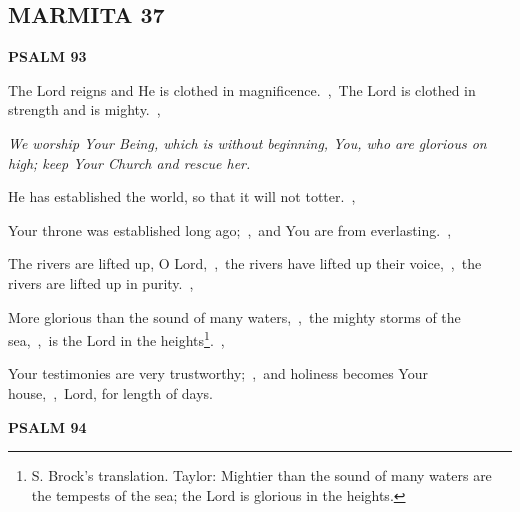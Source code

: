 \documentclass[12pt,twoside,a5paper]{article}
\newcommand{\marmita}[1]{\subsection*{MARMITA {#1}}}
\newcommand{\psalm}[1]{\textbf{PSALM {#1}}\nopagebreak}
\newcommand{\qanona}[1]{{\liturgicalhint{Qanona.} \emph{#1}}}
\begin{document}
\marmita{37}

\psalm{93}

\begin{normalparskip}
  The Lord reigns and He is clothed in magnificence.~\sep\ The Lord is clothed in strength and is mighty.~\sep

  \qanona{We worship Your Being, which is without beginning, You, who are glorious on high; keep Your Church and rescue her.}

  He has established the world, so that it will not totter.~\sep

  Your throne was established long ago;~\sep\ and You are from everlasting.~\sep

  The rivers are lifted up, O Lord,~\sep\ the rivers have lifted up their voice,~\sep\ the rivers are lifted up in purity.~\sep

  More glorious than the sound of many waters,~\sep\ the mighty storms of the sea,~\sep\ is the Lord in the heights\footnote{S. Brock's translation. Taylor: Mightier than the sound of many waters are the tempests of the sea; the Lord is glorious in the heights.}.~\sep

  Your testimonies are very trustworthy;~\sep\ and holiness becomes Your house,~\sep\ Lord, for length of days.
\end{normalparskip}

\psalm{94}
\end{document}
